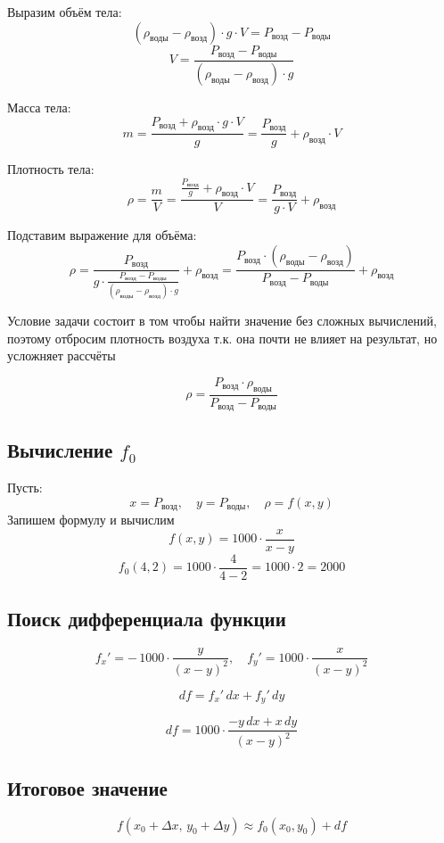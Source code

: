 Выразим объём тела:
\[
(\rho_{\text{воды}} - \rho_{\text{возд}}) \cdot g \cdot V = P_{\text{возд}} - P_{\text{воды}}
\]
\[
V = \frac{P_{\text{возд}} - P_{\text{воды}}}{(\rho_{\text{воды}} - \rho_{\text{возд}}) \cdot g}
\]

Масса тела:
\[
m = \frac{P_{\text{возд}} + \rho_{\text{возд}} \cdot g \cdot V}{g} = \frac{P_{\text{возд}}}{g} + \rho_{\text{возд}} \cdot V
\]

Плотность тела:
\[
\rho = \frac{m}{V} = \frac{\frac{P_{\text{возд}}}{g} + \rho_{\text{возд}} \cdot V}{V} = \frac{P_{\text{возд}}}{g \cdot V} + \rho_{\text{возд}}
\]

Подставим выражение для объёма:
\[
\rho = \frac{P_{\text{возд}}}{g \cdot \frac{P_{\text{возд}} - P_{\text{воды}}}{(\rho_{\text{воды}} - \rho_{\text{возд}}) \cdot g}} + \rho_{\text{возд}} = \frac{P_{\text{возд}} \cdot (\rho_{\text{воды}} - \rho_{\text{возд}})}{P_{\text{возд}} - P_{\text{воды}}} + \rho_{\text{возд}}
\]

Условие задачи состоит в том чтобы найти значение без сложных вычислений,
поэтому отбросим плотность воздуха т.к. она почти не влияет на результат, но усложняет
рассчёты

\[
\rho = \frac{P_{\text{возд}} \cdot \rho_{\text{воды}}}{P_{\text{возд}} - P_{\text{воды}}}
\]

\subsection{Вычисление $f_0$}
Пусть:
\[
x = P_{\text{возд}}, \quad y = P_{\text{воды}}, \quad \rho = f(x,y)
\]
Запишем формулу и вычислим
\[
f(x, y) = 1000 \cdot \frac{x}{x - y}
\]
\[
f_0(4, 2) = 1000 \cdot \frac{4}{4 - 2} = 1000 \cdot 2 = 2000
\]

\subsection{Поиск дифференциала функции}

\[
f_x' = -\,1000 \cdot \frac{y}{(x - y)^2}, 
\quad
f_y' = 1000 \cdot \frac{x}{(x - y)^2}
\]

\[
df = f_x'\,dx + f_y'\,dy
\]

\[
df = 1000 \cdot \frac{-y\,dx + x\,dy}{(x - y)^2}
\]

\subsection{Итоговое значение}

\[
f(x_0 + \Delta x,\, y_0 + \Delta y)
\approx
f_0(x_0, y_0) + df
\]

